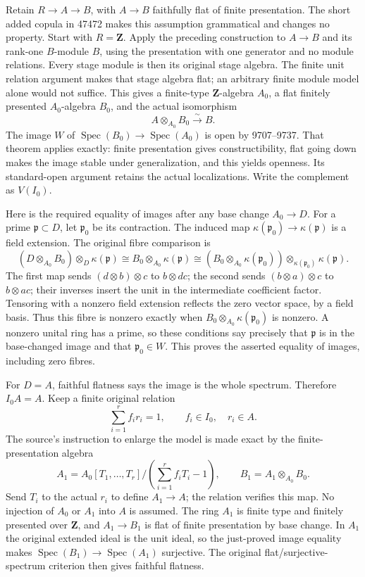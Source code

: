 Retain \(R\to A\to B\), with \(A\to B\) faithfully flat of finite presentation. The short added copula in 47472 makes this assumption grammatical and changes no property. Start with \(R=\mathbf Z\). Apply the preceding construction to \(A\to B\) and its rank-one \(B\)-module \(B\), using the presentation with one generator and no module relations. Every stage module is then its original stage algebra. The finite unit relation argument makes that stage algebra flat; an arbitrary finite module model alone would not suffice. This gives a finite-type \(\mathbf Z\)-algebra \(A_0\), a flat finitely presented \(A_0\)-algebra \(B_0\), and the actual isomorphism \[
 A\otimes_{A_0}B_0\xrightarrow{\sim}B.
\] The image \(W\) of \(\operatorname{Spec}(B_0)\to\operatorname{Spec}(A_0)\) is open by 9707--9737. That theorem applies exactly: finite presentation gives constructibility, flat going down makes the image stable under generalization, and this yields openness. Its standard-open argument retains the actual localizations. Write the complement as \(V(I_0)\).

Here is the required equality of images after any base change \(A_0\to D\). For a prime \(\mathfrak p\subset D\), let \(\mathfrak p_0\) be its contraction. The induced map \(\kappa(\mathfrak p_0)\to\kappa(\mathfrak p)\) is a field extension. The original fibre comparison is \[
 (D\otimes_{A_0}B_0)\otimes_D\kappa(\mathfrak p)
 \cong B_0\otimes_{A_0}\kappa(\mathfrak p)
 \cong (B_0\otimes_{A_0}\kappa(\mathfrak p_0))
            \otimes_{\kappa(\mathfrak p_0)}\kappa(\mathfrak p).
\] The first map sends \((d\otimes b)\otimes c\) to \(b\otimes dc\); the second sends \((b\otimes a)\otimes c\) to \(b\otimes ac\); their inverses insert the unit in the intermediate coefficient factor. Tensoring with a nonzero field extension reflects the zero vector space, by a field basis. Thus this fibre is nonzero exactly when \(B_0\otimes_{A_0}\kappa(\mathfrak p_0)\) is nonzero. A nonzero unital ring has a prime, so these conditions say precisely that \(\mathfrak p\) is in the base-changed image and that \(\mathfrak p_0\in W\). This proves the asserted equality of images, including zero fibres.

For \(D=A\), faithful flatness says the image is the whole spectrum. Therefore \(I_0A=A\). Keep a finite original relation \[
 \sum_{i=1}^r f_i r_i=1,\qquad f_i\in I_0,\quad r_i\in A.
\] The source's instruction to enlarge the model is made exact by the finite-presentation algebra \[
 A_1=A_0[T_1,\ldots,T_r]/\left(\sum_{i=1}^r f_iT_i-1\right),
 \qquad B_1=A_1\otimes_{A_0}B_0.
\] Send \(T_i\) to the actual \(r_i\) to define \(A_1\to A\); the relation verifies this map. No injection of \(A_0\) or \(A_1\) into \(A\) is assumed. The ring \(A_1\) is finite type and finitely presented over \(\mathbf Z\), and \(A_1\to B_1\) is flat of finite presentation by base change. In \(A_1\) the original extended ideal is the unit ideal, so the just-proved image equality makes \(\operatorname{Spec}(B_1)\to\operatorname{Spec}(A_1)\) surjective. The original flat/surjective-spectrum criterion then gives faithful flatness.

